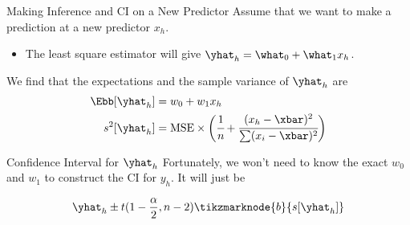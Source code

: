 \documentclass[aspectratio=169,xcolor=dvipsnames,svgnames,x11names,fleqn]{beamer}
\begin{document}
    
    
\begin{frame}{Making Inference and CI on a New Predictor}
    Assume that we want to make a prediction at a new predictor $x_h$.
    
    \begin{itemize}
        \item The least square estimator will give $\yhat_h = \what_0 + \what_1 x_h$.
    \end{itemize}
    
    We find that the expectations and the sample variance of $\yhat_h$ are
    \begin{equation}
        \begin{aligned}
            \Ebb[\yhat_h] & = w_0 + w_1 x_h\\
            s^2[\yhat_h] & = \textrm{MSE} \times \bigg( \cfrac{1}{n} + \cfrac{(x_h - \xbar)^2}{\sum (x_i - \xbar)^2} \bigg)
        \end{aligned}
    \end{equation}
    \end{frame}
    
    \begin{frame}{Confidence Interval for $\yhat_h$}
    Fortunately, we won't need to know the exact $w_0$ and $w_1$ to construct the CI for $y_h$. It will just be 
    
    \begin{gradblock}{}
    {\Huge
    \begin{equation}
    {
        \yhat_h \pm t(1- \frac{\alpha}{2}, n - 2)\tikzmarknode{b}{s[\yhat_h ]}
    }
    \end{equation}
    }
    \end{gradblock}
    \end{frame}
    
\end{document}
